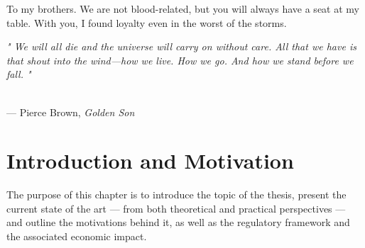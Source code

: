 \documentclass[12pt]{report} %
\begin{document}
    To my brothers. We are not blood-related, but you will always have a seat at my table. With you, I found loyalty even in the worst of the storms.
		
	\vfill

    \begin{flushright}
    \begin{minipage}{0.7\textwidth}
        \textit{" We will all die and the universe will carry on without care.
        All that we have is that shout into the wind—how we live.
        How we go. And how we stand before we fall. "}
    
        \vspace{0.3cm}
        \end{minipage}
        \\
        --- Pierce Brown, \textit{Golden Son}
    \end{flushright}


    \vspace{2cm}
	
	\newpage %
	\thispagestyle{empty}
	\mbox{}
	


\tableofcontents
\thispagestyle{fancy}

\newpage %
\thispagestyle{empty}
\mbox{}

\listoffigures
\thispagestyle{fancy}

\newpage %
\thispagestyle{empty}
\mbox{}

\listoftables
\thispagestyle{fancy}

\newpage %
\thispagestyle{empty}
\mbox{}

\clearpage
{} %

\chapter{Introduction and Motivation}

The purpose of this chapter is to introduce the topic of the thesis, present the current state of the art --- from both theoretical and practical perspectives --- and outline the motivations behind it, as well as the regulatory framework and the associated economic impact.
\end{document}
